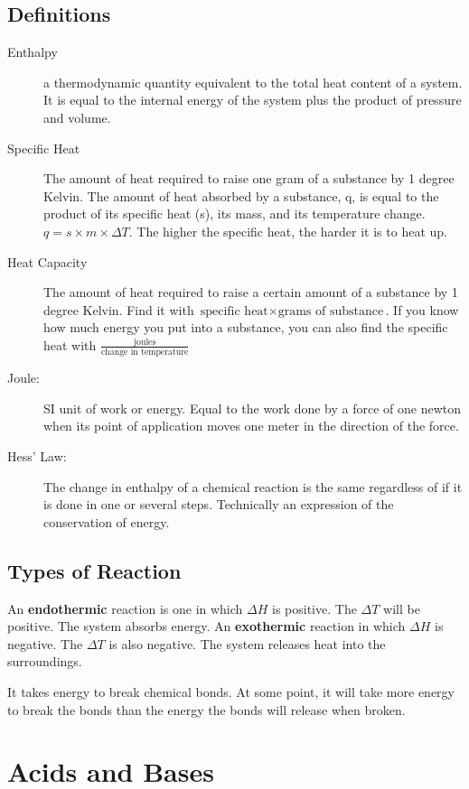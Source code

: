 \documentclass[]{article}
\begin{document}
\subsection{Definitions}
\begin{description}
\item[Enthalpy] a thermodynamic quantity equivalent to the total heat content of a system. It is equal to the internal energy of the system plus the product of pressure and volume.

\item[Specific Heat] The amount of heat required to raise one gram of a substance by 1 degree Kelvin. 
The amount of heat absorbed by a substance, q, is equal to the product of its specific heat (s), its mass, and its temperature change. $ q = s \times m \times \Delta T $. The higher the specific heat, the harder it is to heat up.
\item[Heat Capacity] The amount of heat required to raise a certain amount of a substance by 1 degree Kelvin. Find it with $ \text{specific heat} \times \text{grams of substance} $. If you know how much energy you put into a substance, you can also find the specific heat with $ \frac{\text{joules}}{\text{change in temperature}} $
\item[Joule:] SI unit of work or energy. Equal to the work done by a force of one newton when its point of application moves one meter in the direction of the force.
\item[Hess' Law:] The change in enthalpy of a chemical reaction is the same regardless of if it is done in one or several steps. Technically an expression of the conservation of energy.
\end{description}
\subsection{Types of Reaction}
An \textbf{endothermic} reaction is one in which $ \Delta H $ is positive. The $ \Delta T $ will be positive. The system absorbs energy. An \textbf{exothermic} reaction in which $ \Delta H $ is negative. The $ \Delta T $ is also negative. The system releases heat into the surroundings.

It takes energy to break chemical bonds. At some point, it will take more energy to break the bonds than the energy the bonds will release when broken. 
\section{Acids and Bases}
\end{document}
